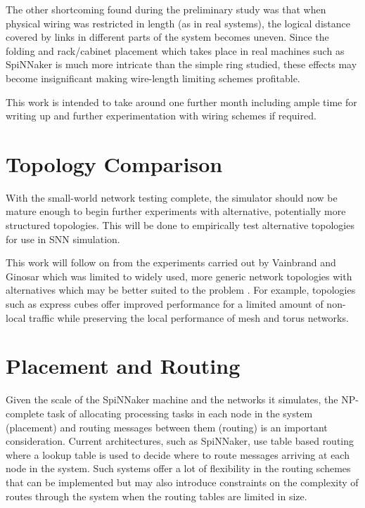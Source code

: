 		The other shortcoming found during the preliminary study was that when
		physical wiring was restricted in length (as in real systems), the logical
		distance covered by links in different parts of the system becomes uneven.
		Since the folding and rack/cabinet placement which takes place in real
		machines such as SpiNNaker is much more intricate than the simple ring
		studied, these effects may become insignificant making wire-length limiting
		schemes profitable.
		
		This work is intended to take around one further month including ample time
		for writing up and further experimentation with wiring schemes if required.
	
	
	\section{Topology Comparison}
		
		With the small-world network testing complete, the simulator should now be
		mature enough to begin further experiments with alternative, potentially
		more structured topologies. This will be done to empirically test
		alternative topologies for use in SNN simulation.
		
		This work will follow on from the experiments carried out by Vainbrand and
		Ginosar which was limited to widely used, more generic network topologies
		with alternatives which may be better suited to the problem
		\cite{vainbrand11}. For example, topologies such as express cubes
		\cite{dally91} offer improved performance for a limited amount of non-local
		traffic while preserving the local performance of mesh and torus networks.
	
	\section{Placement and Routing}
		
		Given the scale of the SpiNNaker machine and the networks it simulates, the
		NP-complete task of allocating processing tasks in each node in the system
		(placement) and routing messages between them (routing) is an important
		consideration. Current architectures, such as SpiNNaker, use table based
		routing where a lookup table is used to decide where to route messages
		arriving at each node in the system. Such systems offer a lot of flexibility
		in the routing schemes that can be implemented but may also introduce
		constraints on the complexity of routes through the system when the routing
		tables are limited in size.
		
